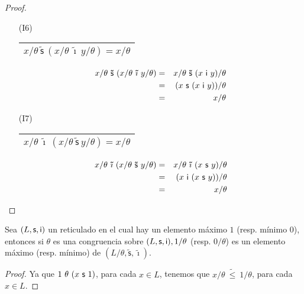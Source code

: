 \begin{proof}
\begin{multicols}{2}
\begin{enumerate}
        \item[(I6)] \begin{tabular}{|c|} \hline $x/\theta \ \mathsf{\tilde{s}} \ (x/\theta \ \mathsf{\tilde{\imath}} \
          y/\theta) = x/\theta$ \\\hline \end{tabular}
          \begin{eqnarray*}
            x/\theta \ \mathsf{\tilde{s}} \ (x/\theta \ \mathsf{\tilde{\imath}} \ y/\theta) &=& x/\theta \ \mathsf{\tilde{s}}
              \ (x \ \IN \ y)/\theta \\
            &=& (x \ \SU \ (x \ \IN \ y))/\theta \\
            &=& x/\theta
          \end{eqnarray*}
        \item[(I7)] \begin{tabular}{|c|} \hline $x/\theta \ \mathsf{\tilde{\imath}} \ (x/\theta \ \mathsf{\tilde{s}} \
          y/\theta) = x/\theta$ \\\hline \end{tabular}
          \begin{eqnarray*}
            x/\theta \ \mathsf{\tilde{\imath}} \ (x/\theta \ \mathsf{\tilde{s}} \ y/\theta) &=& x/\theta \
              \mathsf{\tilde{\imath}} \ (x \ \SU \ y)/\theta \\
            &=& (x \ \IN \ (x \ \SU \ y))/\theta \\
            &=& x/\theta
          \end{eqnarray*}
      \end{enumerate}
    \end{multicols}
  \end{proof}

  \begin{corollary}
    \PN Sea $(L, \mathsf{s}, \mathsf{i})$ un reticulado en el cual hay un elemento máximo $1$ (resp. mínimo $0$), entonces si $\theta$
    es una congruencia sobre $(L, \mathsf{s}, \mathsf{i}), 1/\theta$ (resp. $0/\theta$) es un elemento máximo (resp. mínimo) de
    $(L/\theta, \mathsf{\tilde{s}}, \mathsf{\tilde{\imath}})$.
  \end{corollary}
  \begin{proof}
    \PN Ya que $1 \ \theta \ (x \ \SU \ 1)$, para cada $x \in L$, tenemos que $x/\theta \ \tilde{\leq} \ 1/\theta$, para
    cada $x \in L$.
  \end{proof}

